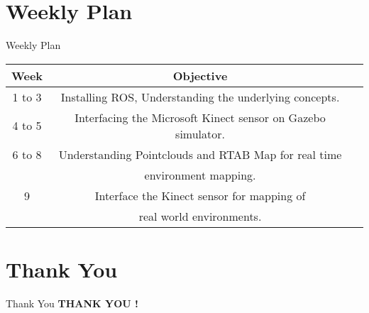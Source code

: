 \documentclass[11pt, a4paper]{beamer}
\begin{document}
\section{Weekly Plan}
\begin{frame}{Weekly Plan }

		\begin{tabular}{|c|c|c|}
			\hline
			\textbf{Week} & \textbf{Objective}\\
			\hline
			1 to 3 & Installing ROS, Understanding the underlying concepts. \\
			\hline
			4 to 5 & Interfacing the Microsoft Kinect sensor on Gazebo simulator.\\
			\hline
			6 to 8 & Understanding Pointclouds and RTAB Map for real time \\ & environment mapping. \\
			\hline
			9  &  Interface the Kinect sensor for mapping of \\ & real world environments.\\
			\hline
			
			
			
			

		\end{tabular}	
\end{frame}

\section{Thank You}
	\begin{frame}{Thank You}
	\centering \textbf{THANK YOU !}
	\end{frame}
\end{document}
